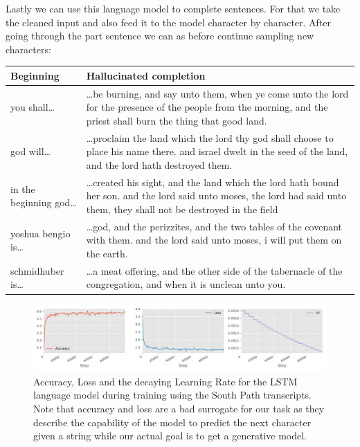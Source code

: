 \documentclass{article}
\begin{document}
Lastly we can use this language model to complete sentences. For that we take the cleaned input and also feed it to the model character by character. After going through the part sentence we can as before continue sampling new characters:

\begin{tabularx}{\linewidth}{lX}
  Beginning & Hallucinated completion\\ \toprule
  you shall\dots & \dots be burning, and say unto them, when ye come unto the lord for the presence of the people from the morning, and the priest shall burn the thing that good land.\\
  god will\dots & \dots proclaim the land which the lord thy god shall choose to place his name there. and israel dwelt in the seed of the land, and the lord hath destroyed them.\\
  in the beginning god\dots & \dots created his sight, and the land which the lord hath bound her son. and the lord said unto moses, the lord had said unto them, they shall not be destroyed in the field\\
  yoshua bengio is\dots & \dots god, and the perizzites, and the two tables of the covenant with them. and the lord said unto moses, i will put them on the earth.\\
  schmidhuber is\dots & \dots a meat offering, and the other side of the tabernacle of the congregation, and when it is unclean unto you.\\\bottomrule
\end{tabularx}



\begin{figure}
  \centering
  \includegraphics[width=\linewidth]{assignment_2/part2/results/southpark_2/southpark.pdf}
  \caption{Accuracy, Loss and the decaying Learning Rate for the LSTM language model during training using the South Path transcripts.
  Note that accuracy and loss are a bad surrogate for our task as they describe the capability of the model to predict the next character given a string while our actual goal is to get a generative model.}
  \label{fig:training_southpark}
\end{figure}
\end{document}
